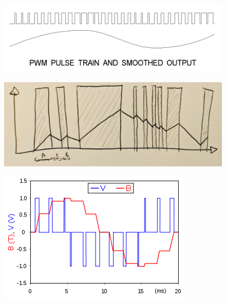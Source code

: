 \par
\begin{figure}[H]
\centering
 \includegraphics[width=\textwidth]{imgs/drawings/pwm/original.png}
 \end{figure}
\par
\par
\begin{figure}[H]
\centering
 \includegraphics[width=\textwidth]{imgs/drawings/pwm/reconstructed.png}
 \end{figure}
\par
\par
\begin{figure}[H]
\centering
 \includegraphics[width=\textwidth]{imgs/drawings/pwm/reconstructed2.png}
 \end{figure}
\par


